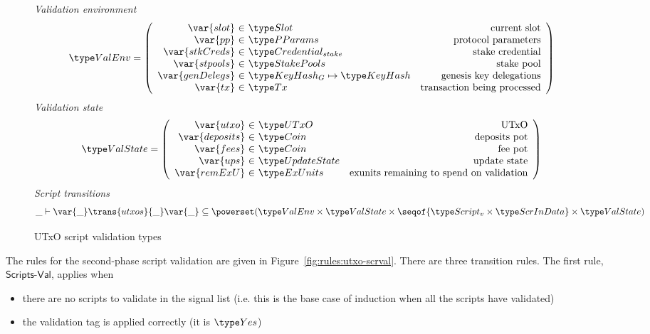 \begin{figure}[htb]
  \emph{Validation environment}
  \begin{equation*}
    \ValEnv =
    \left(
      \begin{array}{r@{~\in~}lr}
        \var{slot} & \Slot & \text{current slot}\\
        \var{pp} & \PParams & \text{protocol parameters}\\
        \var{stkCreds} & \StakeCredential & \text{stake credential}\\
        \var{stpools} & \StakePools & \text{stake pool}\\
        \var{genDelegs} & \KeyHashGen\mapsto\KeyHash & \text{genesis key delegations} \\
        \var{tx} & \Tx & \text{transaction being processed} \\
      \end{array}
    \right)
  \end{equation*}
  \emph{Validation state}
  \begin{equation*}
    \ValState =
    \left(
      \begin{array}{r@{~\in~}lr}
        \var{utxo} & \UTxO & \text{UTxO}\\
        \var{deposits} & \Coin & \text{deposits pot}\\
        \var{fees} & \Coin & \text{fee pot}\\
        \var{ups} & \UpdateState & \text{update state}\\
        \var{remExU} & \ExUnits & \text{exunits remaining to spend on validation} \\
      \end{array}
    \right)
  \end{equation*}
  \emph{Script transitions}
  \begin{equation*}
    \_ \vdash
    \var{\_} \trans{utxos}{\_} \var{\_}
    \subseteq \powerset (\ValEnv \times \ValState \times \seqof{\ScriptV\times\ScrInData} \times \ValState)
  \end{equation*}
  \caption{UTxO script validation types}
  \label{fig:ts-types:utxo-scripts}
\end{figure}

The rules for the second-phase script validation are given in
Figure~\ref{fig:rules:utxo-scrval}. There are three transition rules.
The first rule, $\mathsf{Scripts\mbox{-}Val}$, applies when

\begin{itemize}
\item there
are no scripts to validate in the signal list (i.e. this is the base case of
induction when all the scripts have validated)
\item the validation tag is applied correctly (it is $\Yes$)
\end{itemize}

